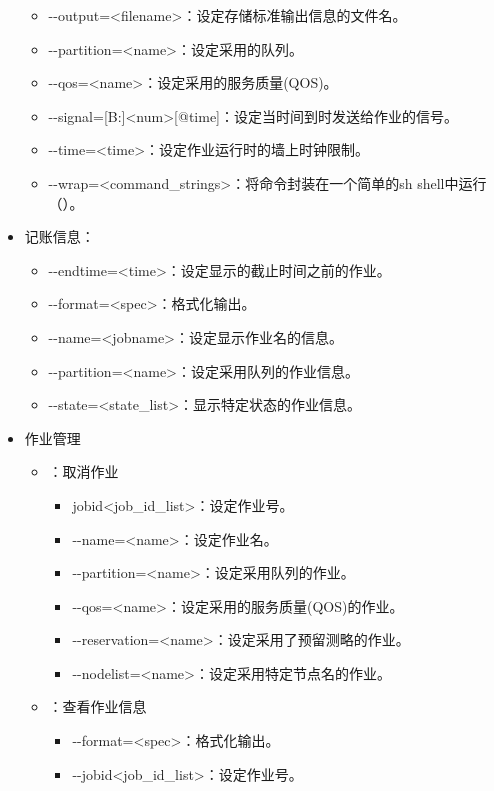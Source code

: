 \begin{itemize}
\begin{itemize}
	\item -{}-output=<filename>：设定存储标准输出信息的文件名。
	\item -{}-partition=<name>：设定采用的队列。
	\item -{}-qos=<name>：设定采用的服务质量(QOS)。
	\item -{}-signal=[B:]<num>[@time]：设定当时间到时发送给作业的信号。
	\item -{}-time=<time>：设定作业运行时的墙上时钟限制。
	\item -{}-wrap=<command\_strings>：将命令封装在一个简单的sh shell中运行（）。
\end{itemize}
\item 记账信息：
\begin{itemize}
	\item -{}-endtime=<time>：设定显示的截止时间之前的作业。
	\item -{}-format=<spec>：格式化输出。
	\item -{}-name=<jobname>：设定显示作业名的信息。
	\item -{}-partition=<name>：设定采用队列的作业信息。
	\item -{}-state=<state\_list>：显示特定状态的作业信息。
\end{itemize}
\item 作业管理
\begin{itemize}
	\item {}：取消作业
\begin{itemize}
	\item jobid<job\_id\_list>：设定作业号。
	\item -{}-name=<name>：设定作业名。
	\item -{}-partition=<name>：设定采用队列的作业。
	\item -{}-qos=<name>：设定采用的服务质量(QOS)的作业。	
	\item -{}-reservation=<name>：设定采用了预留测略的作业。
	\item -{}-nodelist=<name>：设定采用特定节点名的作业。
\end{itemize}
	\item {}：查看作业信息
\begin{itemize}
	\item -{}-format=<spec>：格式化输出。
	\item -{}-jobid<job\_id\_list>：设定作业号。

\end{itemize}
\end{itemize}
\end{itemize}
